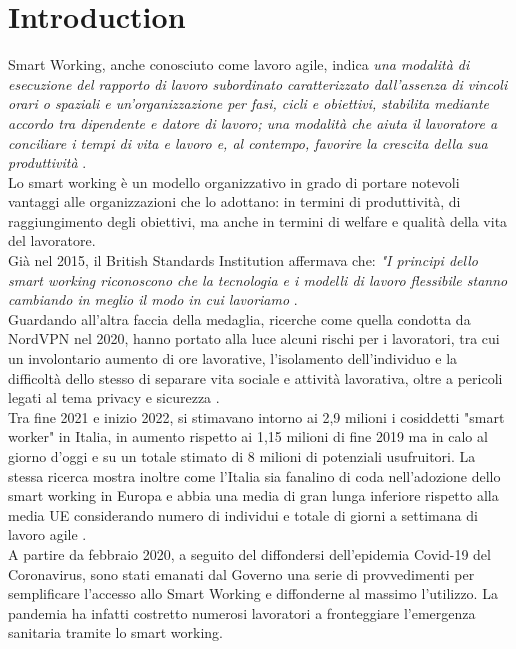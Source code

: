 \documentclass[12pt,journal,compsoc]{IEEEtran}
\begin{document}
\section{Introduction}
 Smart Working, anche conosciuto come lavoro agile, indica \textit{una modalità di esecuzione del rapporto di lavoro subordinato caratterizzato dall'assenza di vincoli orari o spaziali e un'organizzazione per fasi, cicli e obiettivi, stabilita mediante accordo tra dipendente e datore di lavoro; una modalità che aiuta il lavoratore a conciliare i tempi di vita e lavoro e, al contempo, favorire la crescita della sua produttività} \cite{Gazzetta} \cite{MIUR}.\\
Lo smart working è un modello organizzativo in grado di portare notevoli vantaggi alle organizzazioni che lo adottano: in termini di produttività, di raggiungimento degli obiettivi, ma anche in termini di welfare e qualità della vita del lavoratore.\\
Già nel 2015, il British Standards Institution affermava che: \textit{"I principi dello smart working riconoscono che la tecnologia e i modelli di lavoro flessibile stanno cambiando in meglio il modo in cui lavoriamo} \cite{BSI}.\\
Guardando all'altra faccia della medaglia, ricerche come quella condotta da NordVPN nel 2020, hanno portato alla luce alcuni rischi per i lavoratori, tra cui un involontario aumento di ore lavorative, l'isolamento dell'individuo e la difficoltà dello stesso di separare vita sociale e attività lavorativa, oltre a pericoli legati al tema privacy e sicurezza \cite{Forbes}.\\
Tra fine 2021 e inizio 2022, si stimavano intorno ai 2,9 milioni i cosiddetti "smart worker" in Italia, in aumento rispetto ai 1,15 milioni di fine 2019 ma in calo al giorno d'oggi e su un totale stimato di 8 milioni di potenziali usufruitori. La stessa ricerca mostra inoltre come l'Italia sia fanalino di coda nell'adozione dello smart working in Europa e abbia una media di gran lunga inferiore rispetto alla media UE considerando numero di individui e totale di giorni a settimana di lavoro agile \cite{Rai}.\\
A partire da febbraio 2020, a seguito del diffondersi dell'epidemia Covid-19 del Coronavirus, sono stati emanati dal Governo una serie di provvedimenti per semplificare l'accesso allo Smart Working e diffonderne al massimo l'utilizzo. La pandemia ha infatti costretto numerosi lavoratori a fronteggiare l'emergenza sanitaria tramite lo smart working.\\
\end{document}
